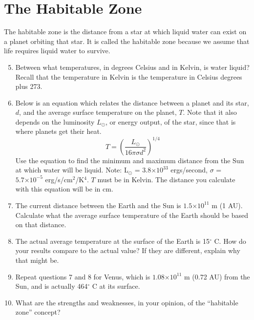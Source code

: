 \documentclass[12pt]{article}%
\providecommand{\e}[1]{\ensuremath{\times 10^{#1}}} %
\begin{document}
\section{The Habitable Zone}

The habitable zone is the distance from a star at which liquid water can exist on a planet orbiting that star.  
It is called the habitable zone because we assume that life requires liquid water to survive.

\begin{enumerate}
\setcounter{enumi}{4}
\item Between what temperatures, in degrees Celsius and in Kelvin, is water liquid?  
Recall that the temperature in Kelvin is the temperature in Celsius degrees plus 273.

\item Below is an equation which relates the distance between a planet and its star, $d$, and the average surface temperature on the planet, $T$. 
Note that it also depends on the luminosity $L_{\odot}$, or energy output, of the star, since that is where planets get their heat.
$$ T = \left( \frac{L_{\odot}}{16 \pi \sigma d^{2}} \right) ^{1/4} $$
Use the equation to find the minimum and maximum distance from the Sun at which water will be liquid.  
Note: L$_{\odot}$ = $3.8 \e{33}$ ergs/second, $\sigma$ = $5.7 \e{-5}$ erg/s/cm$^{2}$/K$^{4}$.  
$T$ must be in Kelvin.  
The distance you calculate with this equation will be in cm.  


\item The current distance between the Earth and the Sun is $1.5 \e{11}$ m (1 AU).  
Calculate what the average surface temperature of the Earth should be based on that distance.

\item The actual average temperature at the surface of the Earth is 15$^{\circ}$ C.  
How do your results compare to the actual value?  
If they are different, explain why that might be.


\item Repeat questions 7 and 8 for Venus, which is $1.08 \e{11}$ m (0.72 AU) from the Sun, and is actually 464$^{\circ}$ C at its surface.

\item What are the strengths and weaknesses, in your opinion, of the ``habitable zone'' concept?

\end{enumerate}
\end{document}

